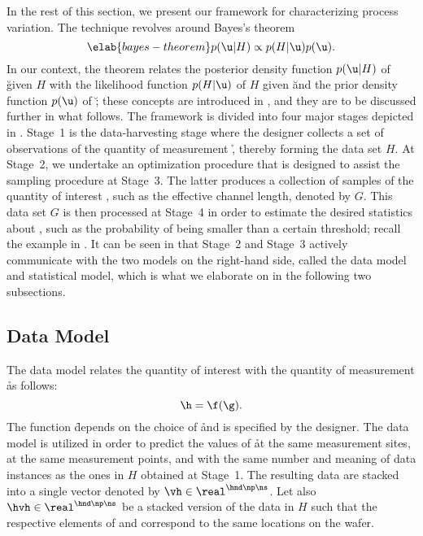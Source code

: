 In the rest of this section, we present our framework for characterizing process
variation. The technique revolves around Bayes's theorem \cite{gelman2013}
\begin{equation} \elab{bayes-theorem}
  p(\u | H) \propto p(H | \u) p(\u).
\end{equation}
In our context, the theorem relates the posterior density function $p(\u |H)$ of
\u given $H$ with the likelihood function $p(H | \u)$ of $H$ given \u and the
prior density function $p(\u)$ of \u; these concepts are introduced in
, and they are to be discussed further in what
follows. The framework is divided into four major stages depicted in
. Stage~1 is the data-harvesting stage where the designer
collects a set of observations of the quantity of measurement \h, thereby
forming the data set $H$. At Stage~2, we undertake an optimization procedure
that is designed to assist the sampling procedure at Stage~3. The latter
produces a collection of samples of the quantity of interest \g, such as the
effective channel length, denoted by $G$. This data set $G$ is then processed at
Stage~4 in order to estimate the desired statistics about \g, such as the
probability of \g being smaller than a certain threshold; recall the example in
. It can be seen in  that Stage~2
and Stage~3 actively communicate with the two models on the right-hand side,
called the data model and statistical model, which is what we elaborate on in
the following two subsections.

\subsection{Data Model}

The data model relates the quantity of interest \g with the quantity of
measurement \h as follows:
\[
  \h = \f(\g).
\]
The function \f depends on the choice of \h and is specified by the designer.
The data model is utilized in order to predict the values of \h at the same
measurement sites, at the same measurement points, and with the same number and
meaning of data instances as the ones in $H$ obtained at Stage~1. The resulting
data are stacked into a single vector denoted by $\vh \in \real^{\hnd \np \ns}$.
Let also $\hvh \in \real^{\hnd \np \ns}$ be a stacked version of the data in $H$
such that the respective elements of \vh and \hvh correspond to the same
locations on the wafer.

